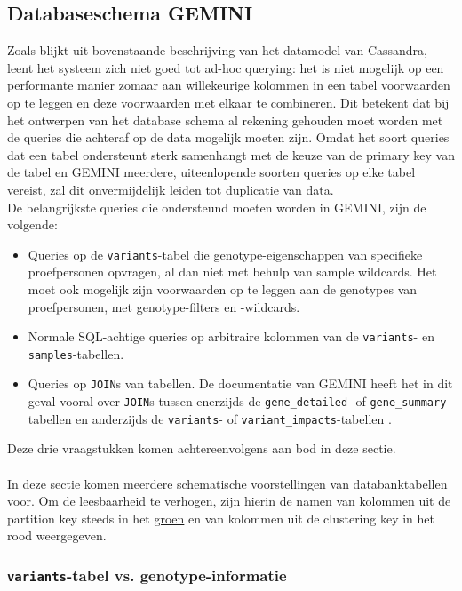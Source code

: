 \subsection{Databaseschema GEMINI}

Zoals blijkt uit bovenstaande beschrijving van het datamodel van Cassandra, leent het systeem zich niet goed tot ad-hoc querying: het is niet mogelijk op een performante manier zomaar aan willekeurige kolommen in een tabel voorwaarden op te leggen en deze voorwaarden met elkaar te combineren. Dit betekent dat bij het ontwerpen van het database schema al rekening gehouden moet worden met de queries die achteraf op de data mogelijk moeten zijn. Omdat het soort queries dat een tabel ondersteunt sterk samenhangt met de keuze van de primary key van de tabel en GEMINI meerdere, uiteenlopende soorten queries op elke tabel vereist, zal dit onvermijdelijk leiden tot duplicatie van data.\\
De belangrijkste queries die ondersteund moeten worden in GEMINI, zijn de volgende:
\begin{itemize}
\item Queries op de \texttt{variants}-tabel die genotype-eigenschappen van specifieke proefpersonen opvragen, al dan niet met behulp van sample wildcards. Het moet ook mogelijk zijn voorwaarden op te leggen aan de genotypes van proefpersonen, met genotype-filters en -wildcards.
\item Normale SQL-achtige queries op arbitraire kolommen van de \texttt{variants}- en \texttt{samples}-tabellen.
\item Queries op \texttt{JOIN}s van tabellen. De documentatie van GEMINI heeft het in dit geval vooral over \texttt{JOIN}s tussen enerzijds de \texttt{gene\_detailed}- of \texttt{gene\_summary}-tabellen en anderzijds de \texttt{variants}- of \texttt{variant\_impacts}-tabellen \cite{gemini_joins}.
\end{itemize}
Deze drie vraagstukken komen achtereenvolgens aan bod in deze sectie.\\\\
In deze sectie komen meerdere schematische voorstellingen van databanktabellen voor. Om de leesbaarheid te verhogen, zijn hierin de namen van kolommen uit de partition key steeds in het {\color{ForestGreen} \underline{groen}} en van kolommen uit de clustering key in het {\color{red} rood} weergegeven.

\subsubsection{\texttt{variants}-tabel vs. genotype-informatie}

